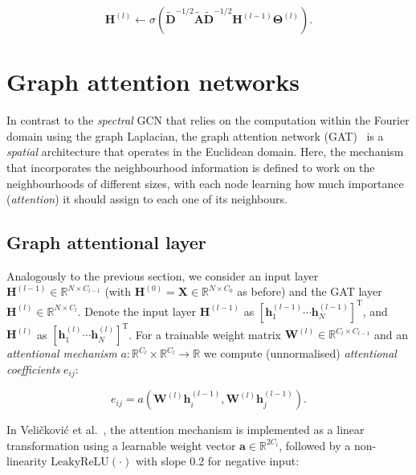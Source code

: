 \begin{equation}
    \mathbf{H}^{(l)} \leftarrow \sigma( \mathbf{\tilde{D}}^{-1/2}\mathbf{\tilde{A}}\mathbf{\tilde{D}}^{-1/2}\mathbf{H}^{(l-1)}\mathbf{\Theta}^{(l)}).
\end{equation}

\section{Graph attention networks}
\label{training-gat}

In contrast to the \textit{spectral} GCN that relies on the computation within the Fourier domain using the graph Laplacian, the graph attention network (GAT)~\cite{velickovic2018graph} is a \textit{spatial} architecture that operates in the Euclidean domain. Here, the mechanism that incorporates the neighbourhood information is defined to work on the neighbourhoods of different sizes, with each node learning how much importance (\textit{attention}) it should assign to each one of its neighbours.


\subsection{Graph attentional layer}
Analogously to the previous section, we consider an input layer $\mathbf{H}^{(l-1)} \in \mathbb{R}^{N\times C_{l-1}}$ (with $\mathbf{H}^{(0)} = \mathbf{X} \in \mathbb{R}^{N\times C_{0}}$ as before) and the GAT layer $\mathbf{H}^{(l)} \in \mathbb{R}^{N\times C_{l}}$. Denote the input layer $\mathbf{H}^{(l-1)}$ as $[\mathbf{h}_1^{(l-1)} \cdots \mathbf{h}_{N}^{(l-1)}]^{\mathrm{T}}$, and $\mathbf{H}^{(l)}$ as $[\mathbf{h}_1^{(l)} \cdots \mathbf{h}_{N}^{(l)}]^{\mathrm{T}}$. For a trainable weight matrix $\mathbf{W}^{(l)} \in \mathbb{R}^{C_{l} \times C_{l-1}}$ and an \textit{attentional mechanism} $a: \mathbb{R}^{C_{l}} \times \mathbb{R}^{C_{l}} \rightarrow \mathbb{R}$ we compute (unnormalised) \textit{attentional coefficients} $e_{ij}$:

\begin{equation}
    e_{ij} = a(\mathbf{W}^{(l)}\mathbf{h}_i^{(l-1)}, \mathbf{W}^{(l)}\mathbf{h}_j^{(l-1)}).
\end{equation}

In Veli{\v{c}}kovi\'{c} et al.~\cite{velickovic2018graph}, the attention mechanism is implemented as a linear transformation using a learnable weight vector $\mathbf{a} \in \mathbb{R}^{2C_{l}}$, followed by a non-linearity $\mathrm{LeakyReLU}(\cdot)$ with slope 0.2 for negative input:


